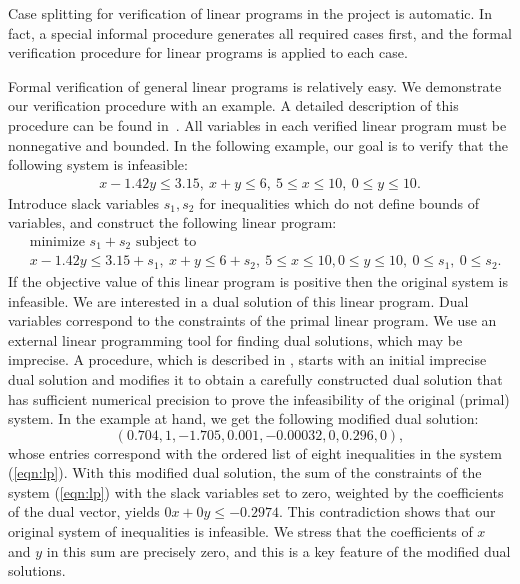 Case splitting for verification of linear programs in the project is
automatic. In fact, a special informal procedure generates all required
cases first, and the formal verification procedure for linear programs is
applied to each case.

Formal verification of general linear programs is relatively easy. We
demonstrate our verification procedure with an example. A detailed
description of this procedure can be found in~\cite{Solovyev:LP}. All
variables in each verified linear program must be nonnegative and
bounded. In the following example, our goal is to verify that the
following system is infeasible:
\begin{equation*}
\begin{split}
x - 1.42 y \le 3.15,\ x + y \le 6,\ 
5 \le x \le 10,\ 0 \le y \le 10.
\end{split}
\end{equation*}
Introduce slack variables $s_1, s_2$ for inequalities which do not
define bounds of variables, and construct the following linear program:
\begin{equation}\label{eqn:lp}
\begin{split}
&\text{minimize $s_1 + s_2$ subject to}\\
&x - 1.42 y \le 3.15 + s_1,\ x + y \le 6 + s_2,\ 
5 \le x \le 10, 0 \le y \le 10,\ 
0 \le s_1,\ 0 \le  s_2.
\end{split}
\end{equation}
If the objective value of this linear program is positive then the
original system is infeasible. We are interested in a dual solution of
this linear program. Dual variables correspond to the constraints of
the primal linear program. We use an external linear programming tool
for finding dual solutions, which may be imprecise.  A procedure,
which is described in \cite{Solovyev:LP}, starts with an initial
imprecise dual solution and modifies it to obtain a carefully
constructed dual solution that has sufficient numerical precision to
prove the infeasibility of the original (primal) system.  In the
example at hand, we get the following modified dual solution:
\[
 (0.704, 1, -1.705, 0.001, -0.00032, 0, 0.296, 0),
\]
whose entries correspond with the ordered list of eight inequalities
in the system (\ref{eqn:lp}).  With this modified dual solution, the
sum of the constraints of the system (\ref{eqn:lp}) with the slack
variables set to zero, weighted by the coefficients of the dual
vector, yields $0 x + 0 y \le -0.2974$. This contradiction shows that
our original system of inequalities is infeasible.  We stress that the
coefficients of $x$ and $y$ in this sum are precisely zero, and this
is a key feature of the modified dual solutions.

